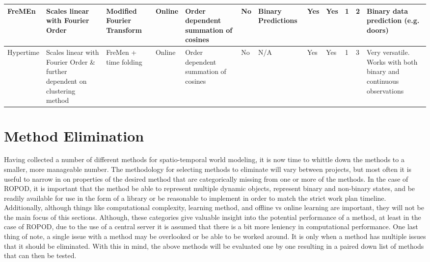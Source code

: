 \begin{center}
{{\begin{tabular}{|p{2.3cm}|p{4cm}|p{3cm}|p{2cm}|p{3cm}|p{1.5cm}|p{3cm}|p{2cm}|p{2cm}|p{2cm}|p{3cm}|p{3cm}|}
        FreMEn    & Scales linear with Fourier Order                                           & Modified Fourier Transform  & Online            & Order dependent summation of cosines           & No            & Binary Predictions     & Yes                    & Yes                   & 1                 & 2                         & Binary data prediction (e.g. doors)                                \\ \hline
        Hypertime & Scales linear with Fourier Order \& further dependent on clustering method & FreMen + time folding       & Online            & Order dependent summation of cosines           & No            & N/A                    & Yes                    & Yes                   & 1                 & 3                         & Very versatile. Works with both binary and continuous observations \\ \hline
        \end{tabular}%
      }
  }
  \end{center}

  \section{ Method Elimination }

  Having collected a number of different methods for spatio-temporal world
  modeling, it is now time to whittle down the methods to a smaller, more
  manageable number. The methodology for selecting methods to eliminate will
  vary between projects, but most often it is useful to narrow in on properties
  of the desired method that are categorically missing from one or more of the
  methods. In the case of ROPOD, it is important that the method be able to
  represent multiple dynamic objects, represent binary and non-binary states,
  and be readily available for use in the form of a library or be reasonable to
  implement in order to match the strict work plan timeline. Additionally, although
  things like computational complexity, learning method, and offline vs online
  learning are important, they will not be the main focus of this sections.
  Although, these categories give valuable insight into the potential performance
  of a method, at least in the case of ROPOD, due to the use of a central server
  it is assumed that there is a bit more leniency in computational performance.
  One last thing of note, a single issue with a method may be overlooked or be
  able to be worked around. It is only when a method has multiple issues that
  it should be eliminated. With this in mind, the above methods will be
  evaluated one by one resulting in a paired down list of methods that can
  then be tested. \\

